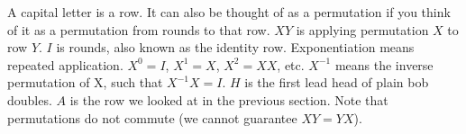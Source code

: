 \documentclass[preview]{standalone}
\begin{document}
\begin{flushleft}
A capital letter is a row. It can also be thought of as a permutation if you think of it as a permutation from rounds to that row. $XY$ is applying permutation $X$ to row $Y$. $I$ is rounds, also known as the identity row. Exponentiation means repeated application. $X^0=I$, $X^1=X$, $X^2=XX$, etc. $X^{-1}$ means the inverse permutation of X, such that $X^{-1}X=I$. $H$ is the first lead head of plain bob doubles. $A$ is the row we looked at in the previous section. Note that permutations do not commute (we cannot guarantee $XY=YX$).
\end{flushleft}
\end{document}
